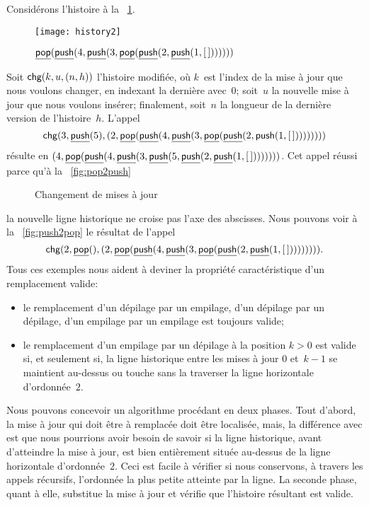 Considérons l'histoire à la \fig~\ref{fig:history2}.
\begin{figure}
\centering
\texttt{[image: history2]}%
\caption{$\underline{\textsf{pop}}(\underline{\textsf{push}}(4,\underline{\textsf{push}}(3,
          \underline{\textsf{pop}}(\underline{\textsf{push}}(2,\underline{\textsf{push}}(1,[\,]))))))$}
\label{fig:history2}
\end{figure}
Soit \(\textsf{chg}(k,u,({n},{h}))\) l'histoire modifiée, où \(k\)~est l'index de la mise à jour que nous voulons changer, en indexant la dernière avec~\(0\); soit~\(u\) la nouvelle mise à jour que nous voulons insérer; finalement, soit~\(n\) la longueur de la dernière version de l'histoire~\(h\). L'appel
\begin{equation*}
\textsf{chg}(3,\underline{\textsf{push}}(5),
  ({2},{\underline{\textsf{pop}}(\underline{\textsf{push}}(4,\underline{\textsf{push}}(3,
           \underline{\textsf{pop}}(\underline{\textsf{push}}(2,\textsf{push}(1,[\,]))))))}))
\end{equation*}
résulte en
\(({4},{\underline{\textsf{pop}}(\underline{\textsf{push}}(4,\underline{\textsf{push}}(3,\underline{\textsf{push}}(5,
  \underline{\textsf{push}}(2,\underline{\textsf{push}}(1,[\,]))))))})\). Cet appel réussi
parce qu'à la \fig~\ref{fig:pop2push}
\begin{figure}
\centering
{}
\quad
{}
\caption{Changement de mises à jour}
\end{figure}
la nouvelle ligne historique ne croise pas l'axe des abscisses. Nous
pouvons voir à la \fig~\ref{fig:push2pop} le résultat de l'appel
\begin{equation*}
\textsf{chg}(2,\underline{\textsf{pop}}(),
            ({2},{\underline{\textsf{pop}}(\underline{\textsf{push}}(4,\underline{\textsf{push}}(3,
                     \underline{\textsf{pop}}(\underline{\textsf{push}}(2,\underline{\textsf{push}}(1,[\,]))))))})).
\end{equation*}
Tous ces exemples nous aident à deviner la propriété caractéristique
d'un remplacement valide:
\begin{itemize}

  \item le remplacement d'un dépilage par un empilage, d'un dépilage par
  un dépilage, d'un empilage par un empilage est toujours valide;

  \item le remplacement d'un empilage par un dépilage à la position
    \(k>0\) est valide si, et seulement si, la ligne historique entre
    les mises à jour \(0\) et~\(k-1\) se maintient au-dessus ou touche
    sans la traverser la ligne horizontale d'ordonnée~\(2\).

\end{itemize}
Nous pouvons concevoir un algorithme procédant en deux phases. Tout
d'abord, la mise à jour qui doit être à remplacée doit être localisée,
mais, la différence avec  est que nous pourrions
avoir besoin de savoir si la ligne historique, avant d'atteindre la
mise à jour, est bien entièrement située au-dessus de la ligne
horizontale d'ordonnée~\(2\). Ceci est facile à vérifier si nous
conservons, à travers les appels récursifs, l'ordonnée la plus petite
atteinte par la ligne. La seconde phase, quant à elle, substitue la mise à jour et vérifie que l'histoire résultant est valide.

